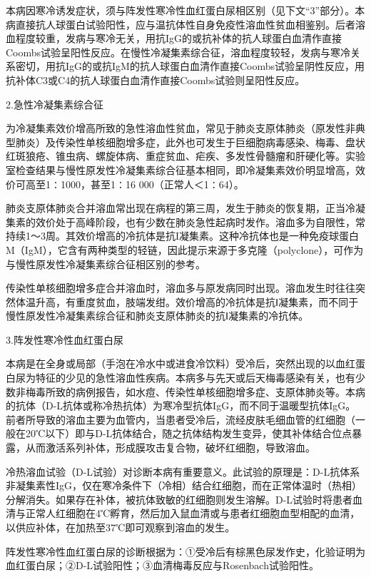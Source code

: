 本病因寒冷诱发症状，须与阵发性寒冷性血红蛋白尿相区别（见下文“3”部分）。本病直接抗人球蛋白试验阳性，应与温抗体性自身免疫性溶血性贫血相鉴别。后者溶血程度较重，发病与寒冷无关，用抗IgG的或抗补体的抗人球蛋白血清作直接Coombs试验呈阳性反应。在慢性冷凝集素综合征，溶血程度较轻，发病与寒冷关系密切，用抗IgG的或抗IgM的抗人球蛋白血清作直接Coombs试验呈阴性反应，用抗补体C3或C4的抗人球蛋白血清作直接Coombs试验则呈阳性反应。

\hypertarget{text00260.htmlux5cux23CHP33-5-4-1-1-2-2}{}
2.急性冷凝集素综合征

为冷凝集素效价增高所致的急性溶血性贫血，常见于肺炎支原体肺炎（原发性非典型肺炎）及传染性单核细胞增多症，此外也可发生于巨细胞病毒感染、梅毒、盘状红斑狼疮、锥虫病、螺旋体病、重症贫血、疟疾、多发性骨髓瘤和肝硬化等。实验室检查结果与慢性原发性冷凝集素综合征基本相同，即冷凝集素效价明显增高，效价可高至1∶1000，甚至1∶16
000（正常人＜1∶64）。

肺炎支原体肺炎合并溶血常出现在病程的第三周，发生于肺炎的恢复期，正当冷凝集素的效价处于高峰阶段，也有少数在肺炎急性起病时发作。溶血多为自限性，常持续1～3周。其效价增高的冷抗体是抗I凝集素。这种冷抗体也是一种免疫球蛋白M（IgM），它含有两种类型的轻链，因此提示来源于多克隆（polyclone），可作为与慢性原发性冷凝集素综合征相区别的参考。

传染性单核细胞增多症合并溶血时，溶血多与原发病同时出现。溶血发生时往往突然体温升高，有重度贫血，肢端发绀。效价增高的冷抗体是抗Ⅰ凝集素，而不同于慢性原发性冷凝集素综合征和肺炎支原体肺炎的抗Ⅰ凝集素的冷抗体。

\hypertarget{text00260.htmlux5cux23CHP33-5-4-1-1-2-3}{}
3.阵发性寒冷性血红蛋白尿

本病是在全身或局部（手泡在冷水中或进食冷饮料）受冷后，突然出现的以血红蛋白尿为特征的少见的急性溶血性疾病。本病多与先天或后天梅毒感染有关，也有少数非梅毒所致的病例报告，如水痘、传染性单核细胞增多症、支原体肺炎等。本病的抗体（D-L抗体或称冷热抗体）为寒冷型抗体IgG，而不同于温暖型抗体IgG。前者所导致的溶血主要为血管内，当患者受冷后，流经皮肤毛细血管的红细胞（一般在20℃以下）即与D-L抗体结合，随之抗体结构发生变异，使其补体结合位点暴露，从而激活系列补体，形成膜攻击复合物，破坏红细胞，导致溶血。

冷热溶血试验（D-L试验）对诊断本病有重要意义。此试验的原理是：D-L抗体系非凝集素性IgG，仅在寒冷条件下（冷相）结合红细胞，而在正常体温时（热相）分解消失。如果存在补体，被抗体致敏的红细胞则发生溶解。D-L试验时将患者血清与正常人红细胞在4℃孵育，然后加入鼠血清或与患者红细胞血型相配的血清，以供应补体，在加热至37℃即可观察到溶血的发生。

阵发性寒冷性血红蛋白尿的诊断根据为：①受冷后有棕黑色尿发作史，化验证明为血红蛋白尿；②D-L试验阳性；③血清梅毒反应与Rosenbach试验阳性。

